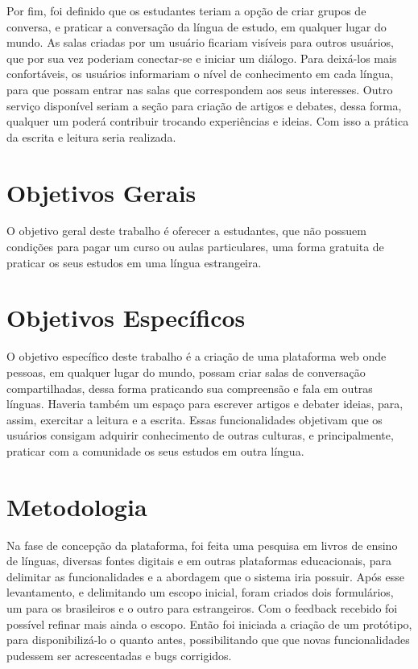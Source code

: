 Por fim, foi definido que os estudantes teriam a opção de criar grupos de conversa, e praticar a conversação da língua de estudo, em qualquer lugar do mundo. As salas criadas por um usuário ficariam visíveis para outros usuários, que por sua vez poderiam conectar-se e iniciar um diálogo. Para deixá-los mais confortáveis, os usuários informariam o nível de conhecimento em cada língua, para que possam entrar nas salas que correspondem aos seus interesses. Outro serviço disponível seriam a seção para criação de artigos e debates, dessa forma, qualquer um poderá contribuir trocando experiências e ideias. Com isso a prática da escrita e leitura seria realizada.


\section{Objetivos Gerais}

O objetivo geral deste trabalho é oferecer a estudantes, que não possuem condições para pagar um curso ou aulas particulares, uma forma gratuita de praticar os seus estudos em uma língua estrangeira.

\section{Objetivos Específicos}

O objetivo específico deste trabalho é a criação de uma plataforma web onde pessoas, em qualquer lugar do mundo, possam criar salas de conversação compartilhadas, dessa forma praticando sua compreensão e fala em outras línguas. Haveria também um espaço para escrever artigos e debater ideias, para, assim, exercitar a leitura e a escrita. Essas funcionalidades objetivam que os usuários consigam adquirir conhecimento de outras culturas, e principalmente, praticar com a comunidade os seus estudos em outra língua.

\section{Metodologia}

Na fase de concepção da plataforma, foi feita uma pesquisa em livros de ensino de línguas, diversas fontes digitais e em outras plataformas educacionais, para delimitar as funcionalidades e a abordagem que o sistema iria possuir. Após esse levantamento, e delimitando um escopo inicial, foram criados dois formulários, um para os brasileiros e o outro para estrangeiros. Com o feedback recebido foi possível refinar mais ainda o escopo. Então foi iniciada a criação de um protótipo, para disponibilizá-lo o quanto antes, possibilitando que que novas funcionalidades pudessem ser acrescentadas e bugs corrigidos.


